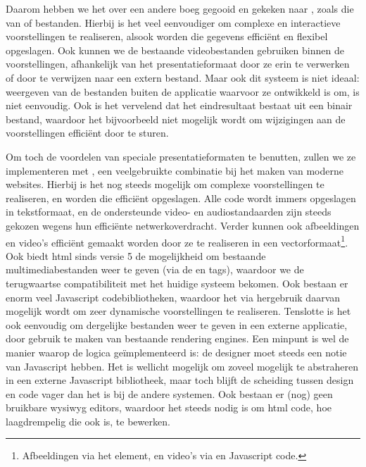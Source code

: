 Daarom hebben we het over een andere boeg gegooid en gekeken naar , zoals die van  of  bestanden. Hierbij is het veel eenvoudiger om complexe en interactieve voorstellingen te realiseren, alsook worden die gegevens efficiënt en flexibel opgeslagen. Ook kunnen we de bestaande videobestanden gebruiken binnen de voorstellingen, afhankelijk van het presentatieformaat door ze erin te verwerken of door te verwijzen naar een extern bestand. Maar ook dit systeem is niet ideaal: weergeven van de bestanden buiten de applicatie waarvoor ze ontwikkeld is om, is niet eenvoudig. Ook is het vervelend dat het eindresultaat bestaat uit een binair bestand, waardoor het bijvoorbeeld niet mogelijk wordt om wijzigingen aan de voorstellingen efficiënt door te sturen.

Om toch de voordelen van speciale presentatieformaten te benutten, zullen we ze implementeren met , een veelgebruikte combinatie bij het maken van moderne websites. Hierbij is het nog steeds mogelijk om complexe voorstellingen te realiseren, en worden die efficiënt opgeslagen. Alle code wordt immers opgeslagen in tekstformaat, en de ondersteunde video- en audiostandaarden zijn steeds gekozen wegens hun efficiënte netwerkoverdracht. Verder kunnen ook afbeeldingen en video's efficiënt gemaakt worden door ze te realiseren in een vectorformaat\footnote{Afbeeldingen via het  element, en video's via  en Javascript code.}. Ook biedt \ac{html} sinds versie 5 de mogelijkheid om bestaande multimediabestanden weer te geven (via de  en  tags), waardoor we de terugwaartse compatibiliteit met het huidige systeem bekomen. Ook bestaan er enorm veel Javascript codebibliotheken, waardoor het via hergebruik daarvan mogelijk wordt om zeer dynamische voorstellingen te realiseren. Tenslotte is het ook eenvoudig om dergelijke bestanden weer te geven in een externe applicatie, door gebruik te maken van bestaande rendering engines. Een minpunt is wel de manier waarop de logica geïmplementeerd is: de designer moet steeds een notie van Javascript hebben. Het is wellicht mogelijk om zoveel mogelijk te abstraheren in een externe Javascript bibliotheek, maar toch blijft de scheiding tussen design en code vager dan het is bij de andere systemen. Ook bestaan er (nog) geen bruikbare \ac{wysiwyg} editors, waardoor het steeds nodig is om \ac{html} code, hoe laagdrempelig die ook is, te bewerken.

